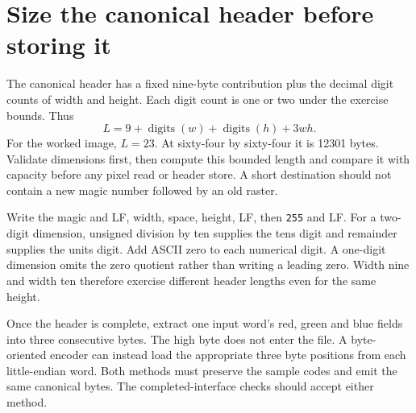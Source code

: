 \section{Size the canonical header before storing it}
The canonical header has a fixed nine-byte contribution plus the decimal digit counts
of width and height. Each digit count is one or two under the exercise bounds. Thus
\[
  L=9+\operatorname{digits}(w)+\operatorname{digits}(h)+3wh.
\]
For the worked image, \(L=23\). At sixty-four by sixty-four it is 12301 bytes.
Validate dimensions first, then compute this bounded length and compare it with capacity
before any pixel read or header store. A short destination should not contain a new
magic number followed by an old raster.

Write the magic and LF, width, space, height, LF, then \texttt{255} and LF. For a
two-digit dimension, unsigned division by ten supplies the tens digit and remainder
supplies the units digit. Add ASCII zero to each numerical digit. A one-digit dimension
omits the zero quotient rather than writing a leading zero. Width nine and width ten
therefore exercise different header lengths even for the same height.

Once the header is complete, extract one input word's red, green and blue fields into
three consecutive bytes. The high byte does not enter the file. A byte-oriented encoder
can instead load the appropriate three byte positions from each little-endian word.
Both methods must preserve the sample codes and emit the same canonical bytes. The
completed-interface checks should accept either method.
